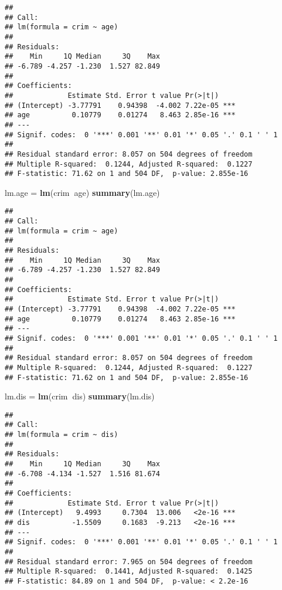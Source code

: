 \documentclass[]{article}
\newenvironment{Shaded}{\begin{snugshade}}{\end{snugshade}}
\newcommand{\KeywordTok}[1]{\textcolor[rgb]{0.13,0.29,0.53}{\textbf{#1}}}
\newcommand{\NormalTok}[1]{#1}
\newcommand{\OperatorTok}[1]{\textcolor[rgb]{0.81,0.36,0.00}{\textbf{#1}}}
\newcommand{\StringTok}[1]{\textcolor[rgb]{0.31,0.60,0.02}{#1}}
\begin{document}
\begin{verbatim}
## 
## Call:
## lm(formula = crim ~ age)
## 
## Residuals:
##    Min     1Q Median     3Q    Max 
## -6.789 -4.257 -1.230  1.527 82.849 
## 
## Coefficients:
##             Estimate Std. Error t value Pr(>|t|)    
## (Intercept) -3.77791    0.94398  -4.002 7.22e-05 ***
## age          0.10779    0.01274   8.463 2.85e-16 ***
## ---
## Signif. codes:  0 '***' 0.001 '**' 0.01 '*' 0.05 '.' 0.1 ' ' 1
## 
## Residual standard error: 8.057 on 504 degrees of freedom
## Multiple R-squared:  0.1244, Adjusted R-squared:  0.1227 
## F-statistic: 71.62 on 1 and 504 DF,  p-value: 2.855e-16
\end{verbatim}

\begin{Shaded}
\begin{Highlighting}[]
\NormalTok{lm.age =}\StringTok{ }\KeywordTok{lm}\NormalTok{(crim}\OperatorTok{~}\NormalTok{age)}
\KeywordTok{summary}\NormalTok{(lm.age)}
\end{Highlighting}
\end{Shaded}

\begin{verbatim}
## 
## Call:
## lm(formula = crim ~ age)
## 
## Residuals:
##    Min     1Q Median     3Q    Max 
## -6.789 -4.257 -1.230  1.527 82.849 
## 
## Coefficients:
##             Estimate Std. Error t value Pr(>|t|)    
## (Intercept) -3.77791    0.94398  -4.002 7.22e-05 ***
## age          0.10779    0.01274   8.463 2.85e-16 ***
## ---
## Signif. codes:  0 '***' 0.001 '**' 0.01 '*' 0.05 '.' 0.1 ' ' 1
## 
## Residual standard error: 8.057 on 504 degrees of freedom
## Multiple R-squared:  0.1244, Adjusted R-squared:  0.1227 
## F-statistic: 71.62 on 1 and 504 DF,  p-value: 2.855e-16
\end{verbatim}

\begin{Shaded}
\begin{Highlighting}[]
\NormalTok{lm.dis =}\StringTok{ }\KeywordTok{lm}\NormalTok{(crim}\OperatorTok{~}\NormalTok{dis)}
\KeywordTok{summary}\NormalTok{(lm.dis)}
\end{Highlighting}
\end{Shaded}

\begin{verbatim}
## 
## Call:
## lm(formula = crim ~ dis)
## 
## Residuals:
##    Min     1Q Median     3Q    Max 
## -6.708 -4.134 -1.527  1.516 81.674 
## 
## Coefficients:
##             Estimate Std. Error t value Pr(>|t|)    
## (Intercept)   9.4993     0.7304  13.006   <2e-16 ***
## dis          -1.5509     0.1683  -9.213   <2e-16 ***
## ---
## Signif. codes:  0 '***' 0.001 '**' 0.01 '*' 0.05 '.' 0.1 ' ' 1
## 
## Residual standard error: 7.965 on 504 degrees of freedom
## Multiple R-squared:  0.1441, Adjusted R-squared:  0.1425 
## F-statistic: 84.89 on 1 and 504 DF,  p-value: < 2.2e-16
\end{verbatim}
\end{document}
